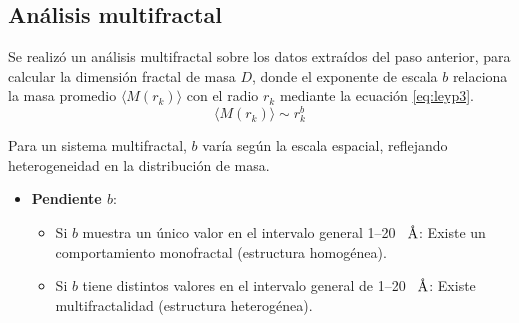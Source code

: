	

	
	
	\subsection{An\'{a}lisis multifractal}
	\label{subsec:anaD}
	
	Se realiz\'{o} un an\'{a}lisis multifractal sobre los datos extra\'{i}dos del paso anterior, para calcular la dimensi\'{o}n fractal de masa $D$, donde el exponente de escala $b$  relaciona la masa  promedio $\langle M(r_{k}) \rangle$ con el radio $r_{k}$ mediante la ecuación \ref{eq:leyp3}.
	\begin{equation}
		\langle M(r_{k}) \rangle \sim r_{k}^b
		\label{eq:leyp3}
	\end{equation}
	
	Para un sistema multifractal, $b$ var\'{i}a seg\'{u}n la escala espacial, reflejando heterogeneidad en la distribuci\'{o}n de masa.
	\begin{itemize}
		\item \textbf{Pendiente $b$}:
		\begin{itemize}
			\item Si $b$ muestra un \'{u}nico valor en el intervalo general 1--20~ $\textup{\r{A}}$: Existe un comportamiento monofractal (estructura homog\'{e}nea).
			\item Si $b$  tiene distintos valores en el intervalo general de 1--20~ $\textup{\r{A}}$: Existe multifractalidad (estructura heterog\'{e}nea).
		\end{itemize}
	\end{itemize}
	
